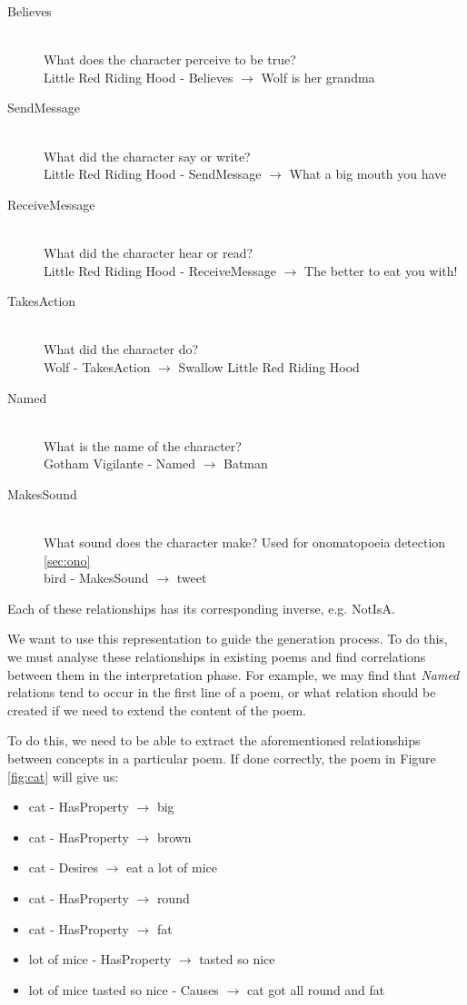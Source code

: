\begin{description}
\item[Believes] \hfill \\ What does the character perceive to be true? \hfill \\ Little Red Riding Hood - Believes $\rightarrow$ Wolf is her grandma
\item[SendMessage] \hfill \\ What did the character say or write?  \hfill \\ Little Red Riding Hood - SendMessage $\rightarrow$ What a big mouth you have
\item[ReceiveMessage] \hfill \\ What did the character hear or read?  \hfill \\ Little Red Riding Hood - ReceiveMessage $\rightarrow$ The better to eat you with!
\item[TakesAction] \hfill \\ What did the character do?  \hfill \\ Wolf - TakesAction $\rightarrow$ Swallow Little Red Riding Hood
\item[Named] \hfill \\ What is the name of the character? \hfill \\ Gotham Vigilante - Named $\rightarrow$ Batman
\item[MakesSound] \hfill \\ What sound does the character make? Used for onomatopoeia detection \ref{sec:ono} \hfill \\ bird - MakesSound $\rightarrow$ tweet
\end{description}

Each of these relationships has its corresponding inverse, e.g. NotIsA. 

We want to use this representation to guide the generation process. To do this, we must analyse these relationships in existing poems and find correlations between them in the interpretation phase. For example, we may find that \textit{Named} relations tend to occur in the first line of a poem, or what relation should be created if we need to extend the content of the poem.  

To do this, we need to be able to extract the aforementioned relationships between concepts in a particular poem. If done correctly, the poem in Figure \ref{fig:cat} will give us: 
\begin{itemize}
\item{cat - HasProperty $\rightarrow$ big}
\item{cat - HasProperty $\rightarrow$ brown}
\item{cat - Desires $\rightarrow$ eat a lot of mice}
\item{cat - HasProperty $\rightarrow$ round}
\item{cat - HasProperty $\rightarrow$ fat}
\item{lot of mice - HasProperty $\rightarrow$ tasted so nice}
\item{lot of mice tasted so nice - Causes $\rightarrow$ cat got all round and fat}
\end{itemize}

